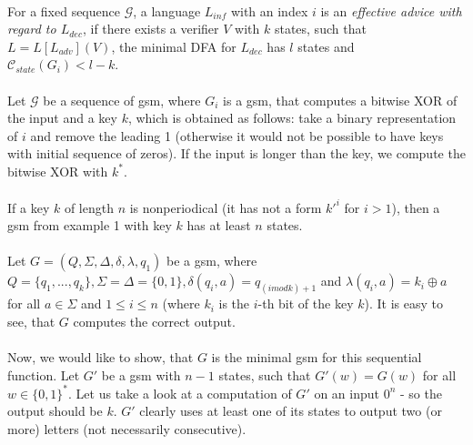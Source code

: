 \documentclass[12pt,oneside,a4paper]{book}
\begin{document}
\paragraph{}
 For a fixed sequence $\mathcal{G}$, a language $L_{inf}$ with an index $i$ is an \emph{effective advice with regard to $L_{dec}$}, if there exists a verifier $V$ with $k$ states, such that $L = L[L_{adv}](V)$, the minimal DFA for $L_{dec}$ has $l$ states and $\mathscr{C}_{state}(G_i) < l - k$.

\paragraph{}
\cpriklad Let $\mathcal{G}$ be a sequence of gsm, where $G_{i}$ is a gsm, that computes a bitwise XOR of the input and a key $k$, which is obtained as follows: take a binary representation of $i$ and remove the leading 1 (otherwise it would not be possible to have keys with initial sequence of zeros). If the input is longer than the key, we compute the bitwise XOR with $k^*$.

\paragraph{}
\clema If a key $k$ of length $n$ is nonperiodical (it has not a form $k'^i$ for $i > 1$), then a gsm from example 1 with key $k$ has at least $n$ states.

\paragraph{}
\dokaz Let $G = (Q, \Sigma, \Delta, \delta, \lambda, q_1)$ be a gsm, where $Q = \{q_1, ..., q_k\}, \Sigma = \Delta = \{0, 1\}, \delta(q_i, a) = q_{(i mod k)+1}$ and $\lambda(q_i, a) = k_i \oplus a$ for all $a \in \Sigma$ and $1 \leq i \leq n$ (where $k_i$  is the $i$-th bit of the key $k$). It is easy to see, that $G$ computes the correct output.

\paragraph{}
Now, we would like to show, that $G$ is the  minimal gsm for this sequential function. Let $G'$ be a gsm with $n-1$ states, such that $G'(w) = G(w)$ for all $w \in \{0,1\}^*$. Let us take a look at a computation of $G'$ on an input $0^n$ - so the output should be $k$. $G'$ clearly uses at least one of its states to output two (or more) letters (not necessarily consecutive). 
\end{document}
